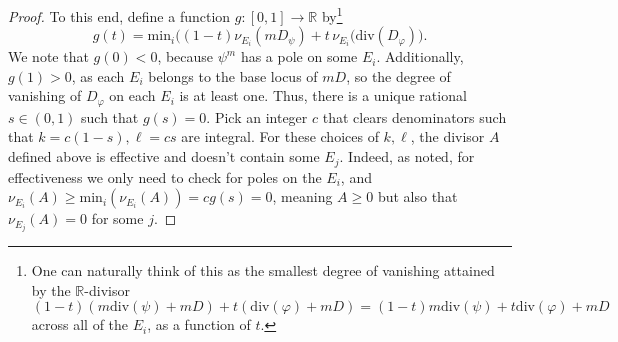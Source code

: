 \documentclass[10pt,a4paper]{amsart}
\begin{document}
\begin{proof}
    To this end, define a function $g : [0,1] \to \mathbb{R}$ by\footnote{One can naturally think of this as the smallest degree of vanishing attained by the $\mathbb{R}$-divisor 
    \begin{equation}
        (1 - t)(m\mathrm{div}(\psi) + mD) + t(\mathrm{div}(\varphi) + mD) = (1 - t)m\mathrm{div}(\psi) + t\mathrm{div}(\varphi) + mD
    \end{equation} across all of the $E_i$, as a function of $t$.}
    \begin{equation}
        g(t) = \mathrm{min}_i\Big((1-t)\nu_{E_i}(mD_\psi) + t \, \nu_{E_i}(\mathrm{div}(D_\varphi)\Big).
    \end{equation}
    We note that $g(0) < 0$, because $\psi^m$ has a pole on some $E_i$. Additionally, $g(1) > 0$, as each $E_i$ belongs to the base locus of $mD$, so the degree of vanishing of $D_\varphi$ on each $E_i$ is at least one. Thus, there is a unique rational $s \in (0,1)$ such that $g(s) = 0$. Pick an integer $c$ that clears denominators such that $k = c(1-s), \ell = cs$ are integral. For these choices of $k, \ell$, the divisor $A$ defined above is effective and doesn't contain some $E_j$. Indeed, as noted, for effectiveness we only need to check for poles on the $E_i$, and $\nu_{E_i}(A) \geq \mathrm{min}_i(\nu_{E_i}(A)) = c g(s) = 0$, meaning $A \geq 0$ but also that $\nu_{E_j}(A) = 0$ for some $j$.
\end{proof}
\end{document}
